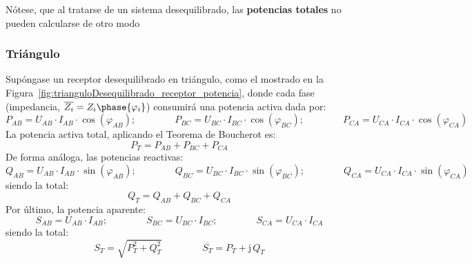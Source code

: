 	\begin{remark}
	    Nótese, que al tratarse de un sistema desequilibrado, las \textbf{potencias totales} no pueden calcularse de otro modo
	\end{remark}
	
	\subsubsection{Triángulo}
	
	Supóngase un receptor desequilibrado en triángulo, como el mostrado en la Figura~\ref{fig:trianguloDesequilibrado_receptor_potencia}, donde cada fase (impedancia, $\overline{Z_i}=Z_i\phase{\varphi_i}$) consumirá una potencia activa dada por: 
	\begin{equation*}
	    P_{AB}=U_{AB}\cdot I_{AB} \cdot \cos(\varphi_{AB});\qquad \qquad
	    P_{BC}=U_{BC}\cdot I_{BC} \cdot \cos(\varphi_{BC});\qquad \qquad
	    P_{CA}=U_{CA}\cdot I_{CA} \cdot \cos(\varphi_{CA})
	\end{equation*}
	La potencia activa total, aplicando el Teorema de Boucherot es:
	\begin{equation}
	    \boxed{P_T=P_{AB}+P_{BC}+P_{CA}}
	\end{equation}
	De forma análoga, las potencias reactivas:
	\begin{equation*}
	    Q_{AB}=U_{AB}\cdot I_{AB} \cdot \sin(\varphi_{AB});\qquad \qquad
	    Q_{BC}=U_{BC}\cdot I_{BC} \cdot \sin(\varphi_{BC});\qquad \qquad
	    Q_{CA}=U_{CA}\cdot I_{CA} \cdot \sin(\varphi_{CA})
	\end{equation*}
	siendo la total: 
	\begin{equation}
	    \boxed{Q_T=Q_{AB}+Q_{BC}+Q_{CA}}
	\end{equation}
	Por último, la potencia aparente: 
	\begin{equation*}
	    S_{AB}=U_{AB}\cdot I_{AB};\qquad \qquad
	    S_{BC}=U_{BC}\cdot I_{BC};\qquad \qquad
	    S_{CA}=U_{CA}\cdot I_{CA}
	\end{equation*}
	siendo la total: 
	\begin{equation}
	    \boxed{S_T=\sqrt{P_T^2+Q_T^2}}\,\qquad\qquad \boxed{\overline{S_T}=P_T+\mathrm{j}\,Q_T}
	\end{equation}
	
